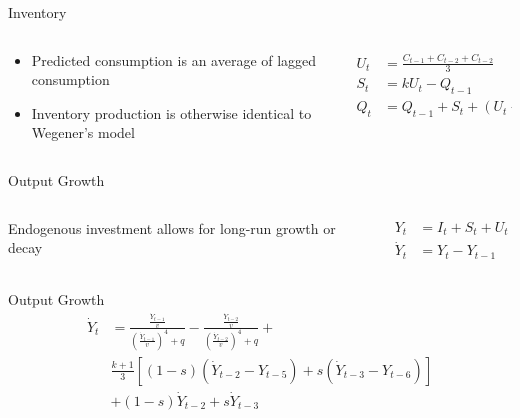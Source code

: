 \documentclass{beamer}
\begin{document}
\begin{frame}{Inventory}
	\begin{columns}
	\begin{column}{0.5\textwidth}
		\begin{itemize}
			\item Predicted consumption is an average of lagged consumption
			\item Inventory production is otherwise identical to Wegener's model
		\end{itemize}
	\end{column}
	\begin{column}{0.5\textwidth}
		\begin{align*}
			U_t &= \frac{C_{t-1}+C_{t-2}+C_{t-2}}{3}\\
			S_t &= kU_t-Q_{t-1}\\
			Q_t &= Q_{t-1} + S_t + (U_t-C_t)
		\end{align*}
	\end{column}
	\end{columns}
\end{frame}

\begin{frame}{Output Growth}
	\begin{columns}
	\begin{column}{0.5\textwidth}
		Endogenous investment allows for long-run growth or decay 
	\end{column}
	\begin{column}{0.5\textwidth}
		\begin{align*}
			Y_t &= I_t + S_t + U_t\\
			\dot Y_t &= Y_{t}-Y_{t-1}
		\end{align*}
	\end{column}
	\end{columns}
\end{frame}

\begin{frame}{Output Growth}
	\begin{equation*}
	\begin{split}
        \dot Y_{t}& = \frac{\frac{\dot Y_{t-1}}{v}}{\left(\frac{\dot Y_{t-1}}{v}\right)^4+q}-\frac{\frac{\dot Y_{t-2}}{v}}{\left(\frac{\dot Y_{t-2}}{v}\right)^4+q} + \\
		& \frac{k+1}{3}\left[(1-s)(\dot Y_{t-2}-Y_{t-5})+s(\dot Y_{t-3}-Y_{t-6})\right]\\
		& +(1-s)\dot Y_{t-2}+s\dot Y_{t-3}
	\end{split}
	\end{equation*}
\end{frame}
\end{document}
